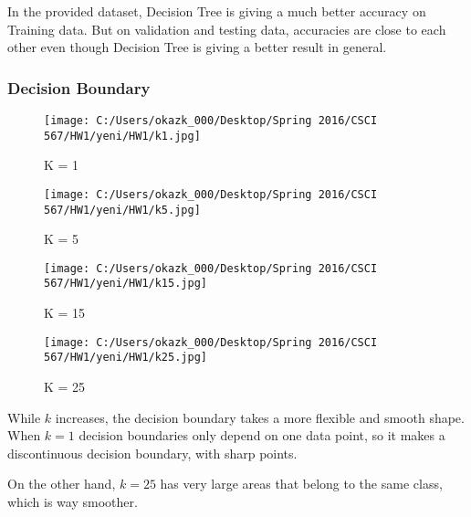 \documentclass[letter,11pt]{article}
\begin{document}
		
		In the provided dataset, Decision Tree is giving a much better accuracy on Training data. But on validation and testing data, accuracies are close to each other even though Decision Tree is giving a better result in general.
		
		\subsubsection{Decision Boundary}
	\begin{figure}[H]%
		\centering
		\texttt{[image: C:/Users/okazk\_000/Desktop/Spring 2016/CSCI 567/HW1/yeni/HW1/k1.jpg]}
		\caption{K = 1}
		\label{fig:test}
	\end{figure}
		\begin{figure}[H]%
			\centering
			\texttt{[image: C:/Users/okazk\_000/Desktop/Spring 2016/CSCI 567/HW1/yeni/HW1/k5.jpg]}
			\caption{K = 5}
			\label{fig:test}
		\end{figure}
			\begin{figure}[H]%
				\centering
				\texttt{[image: C:/Users/okazk\_000/Desktop/Spring 2016/CSCI 567/HW1/yeni/HW1/k15.jpg]}
				\caption{K = 15}
				\label{fig:test}
			\end{figure}
				\begin{figure}[H]%
					\centering
					\texttt{[image: C:/Users/okazk\_000/Desktop/Spring 2016/CSCI 567/HW1/yeni/HW1/k25.jpg]}
					\caption{K = 25}
					\label{fig:test}
				\end{figure}
	While $k$ increases, the decision boundary takes a more flexible and smooth shape. When $k = 1$ decision boundaries only depend on one data point, so it makes a discontinuous decision boundary, with sharp points. 
	
	On the other hand, $k = 25$ has very large areas that belong to the same class, which is way smoother. 
				
	
\end{document}
